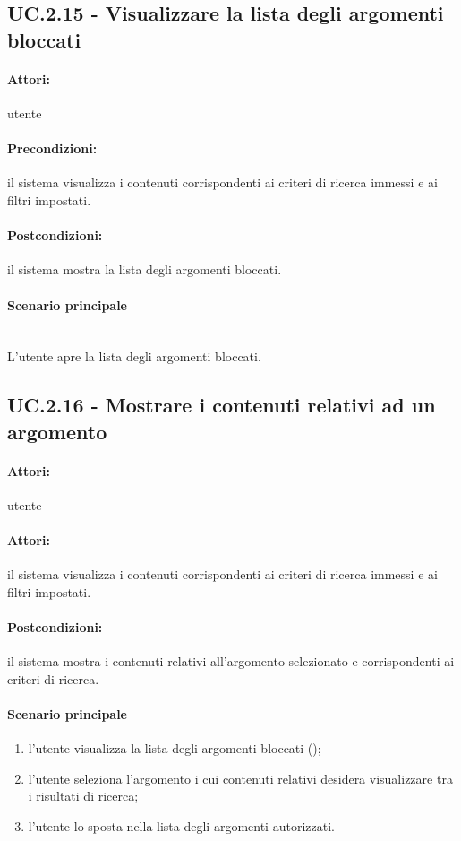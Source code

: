\documentclass[10pt,a4paper,headinclude,footinclude,hidelinks]{scrreprt} %
\begin{document}
	\subsection[UC.2.15]{UC.2.15 - Visualizzare la lista degli argomenti bloccati}
	\label{sec:stage:ar:uc:2_15}
	\paragraph{Attori:} utente
	\paragraph{Precondizioni:} il sistema visualizza i contenuti corrispondenti ai criteri di ricerca immessi e ai filtri impostati.
	\paragraph{Postcondizioni:} il sistema mostra la lista degli argomenti bloccati.
	\paragraph{Scenario principale} \hfill \\
	L'utente apre la lista degli argomenti bloccati.

	\subsection[UC.2.16]{UC.2.16 - Mostrare i contenuti relativi ad un argomento}
	\label{sec:stage:ar:uc:2_16}
	\paragraph{Attori:} utente
	\paragraph{Attori:} il sistema visualizza i contenuti corrispondenti ai criteri di ricerca immessi e ai filtri impostati.
	\paragraph{Postcondizioni:} il sistema mostra i contenuti relativi all'argomento selezionato e corrispondenti ai criteri di ricerca.
	\paragraph{Scenario principale}
	\begin{enumerate}
	\item l'utente visualizza la lista degli argomenti bloccati ();
	\item l'utente seleziona l'argomento i cui contenuti relativi desidera visualizzare tra i risultati di ricerca;
	\item l'utente lo sposta nella lista degli argomenti autorizzati.
	\end{enumerate}
\end{document}
